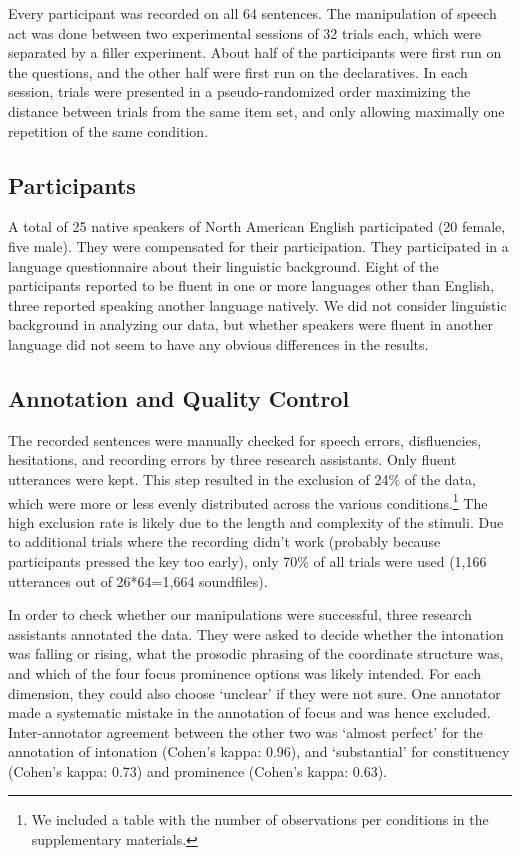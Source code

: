 \documentclass[preprint,review,12pt,authoryear,times]{elsarticle}
\begin{document}
Every participant was recorded on all 64 sentences. The manipulation of speech act was done between two experimental sessions of 32 trials each, which were separated by a filler experiment. About half of the participants were first run on the questions, and the other half were first run on the declaratives.  In each session, trials were presented in a pseudo-randomized order maximizing the distance between trials from the same item set, and only allowing maximally one repetition of the same condition. 


\subsection{Participants}

A total of 25 native speakers of North American English participated (20 female, five male). They were compensated for their participation. They participated in a language questionnaire about their linguistic background. Eight of the participants reported to be fluent in one or more languages other than English, three reported speaking another language natively. We did not consider linguistic background in analyzing our data, but whether speakers were fluent in another language did not seem to have any obvious differences in the results. 


\subsection{Annotation and Quality Control}

The recorded sentences were manually checked for speech errors, disfluencies, hesitations, and recording errors by three research assistants. Only fluent utterances were kept. This step resulted in the exclusion of  24\% of the data, which were more or less evenly distributed across the various conditions.\footnote{We included a table with the number of observations per conditions in the supplementary materials.}  The high exclusion rate is likely due to the length and complexity of the stimuli. Due to additional trials where the recording didn't work (probably because participants pressed the key too early), only 70\% of all trials were used (1,166 utterances out of 26*64=1,664 soundfiles). 

In order to check whether our manipulations were successful, three research assistants annotated the data. They were asked to decide whether the intonation was falling or rising, what the prosodic phrasing of the coordinate structure was, and which of the four focus prominence options was likely intended. For each dimension, they could also choose `unclear' if they were not sure. One annotator made a systematic mistake in the annotation of focus and was hence excluded. Inter-annotator agreement between the other two was `almost perfect' for the annotation of intonation (Cohen's kappa: 0.96), and `substantial' for constituency (Cohen's kappa: 0.73) and prominence (Cohen's kappa: 0.63). 
\end{document}
